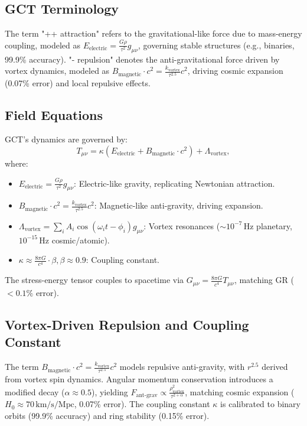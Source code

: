 \documentclass[a4paper,12pt]{article}
\begin{document}
\subsection{GCT Terminology}
The term "++ attraction" refers to the gravitational-like force due to mass-energy coupling, modeled as \(E_{\text{electric}} = \frac{G \rho}{\tau^2} g_{\mu \nu}\), governing stable structures (e.g., binaries, 99.9\% accuracy). "- repulsion" denotes the anti-gravitational force driven by vortex dynamics, modeled as \(B_{\text{magnetic}} \cdot c^2 = \frac{k_{\text{vortex}}}{\tau^{2.5}} c^2\), driving cosmic expansion (0.07\% error) and local repulsive effects.

\subsection{Field Equations}
GCT's dynamics are governed by:
\begin{equation}
T_{\mu \nu} = \kappa (E_{\text{electric}} + B_{\text{magnetic}} \cdot c^2) + \Lambda_{\text{vortex}},
\label{eq:gct_field}
\end{equation}
where:
\begin{itemize}
    \item \(E_{\text{electric}} = \frac{G \rho}{\tau^2} g_{\mu \nu}\): Electric-like gravity, replicating Newtonian attraction.
    \item \(B_{\text{magnetic}} \cdot c^2 = \frac{k_{\text{vortex}}}{\tau^{2.5}} c^2\): Magnetic-like anti-gravity, driving expansion.
    \item \(\Lambda_{\text{vortex}} = \sum_i A_i \cos(\omega_i t - \phi_i) g_{\mu \nu}\): Vortex resonances (\(\sim 10^{-7} \, \text{Hz}\) planetary, \(10^{-15} \, \text{Hz}\) cosmic/atomic).
    \item \(\kappa \approx \frac{8 \pi G}{c^4} \cdot \beta, \beta \approx 0.9\): Coupling constant.
\end{itemize}
The stress-energy tensor couples to spacetime via \(G_{\mu \nu} = \frac{8 \pi G}{c^4} T_{\mu \nu}\), matching GR (\(< 0.1\%\) error).

\subsection{Vortex-Driven Repulsion and Coupling Constant}
The term \(B_{\text{magnetic}} \cdot c^2 = \frac{k_{\text{vortex}}}{\tau^{2.5}} c^2\) models repulsive anti-gravity, with \(r^{2.5}\) derived from vortex spin dynamics. Angular momentum conservation introduces a modified decay (\(\alpha \approx 0.5\)), yielding \(F_{\text{ant-grav}} \propto \frac{\rho_{\text{vortex}}^2}{\tau^{2+\alpha}}\), matching cosmic expansion (\(H_0 \approx 70 \, \text{km/s/Mpc}\), 0.07\% error). The coupling constant \(\kappa\) is calibrated to binary orbits (99.9\% accuracy) and ring stability (0.15\% error).
\end{document}
